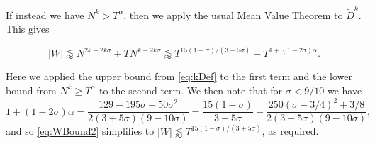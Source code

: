 \documentclass{amsart}
\theoremstyle{plain}
\numberwithin{equation}{section}
\renewcommand{\tilde}{\widetilde}
\begin{document}
If instead we have $N^k>T^\alpha$, then we apply the usual Mean Value Theorem to $\tilde{D}^k$. This gives

\begin{equation}
|W|\lessapprox N^{2k-2k\sigma}+TN^{k-2k\sigma}\lessapprox T^{15(1-\sigma)/(3+5\sigma)}+T^{1+(1-2\sigma)\alpha}.
\label{eq:WBound2}
\end{equation}

Here we applied the upper bound from \eqref{eq:kDef} to the first term and the lower bound from $N^k\ge T^\alpha$ to the second term. We then note that for $\sigma<9/10$ we have 
\[
1+(1-2\sigma)\alpha=\frac{129-195\sigma+50\sigma^2}{2(3+5\sigma)(9-10\sigma)}=\frac{15(1-\sigma)}{3+5\sigma}-\frac{250(\sigma-3/4)^2+3/8}{2(3+5\sigma)(9-10\sigma)},
\]
 and so \eqref{eq:WBound2} simplifies to $|W|\lessapprox T^{15(1-\sigma)/(3+5\sigma)}$, as required.

%
%
%
%
%
%
%
%
%
\end{document}
